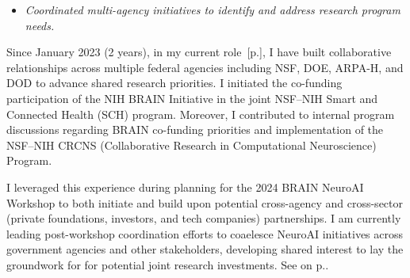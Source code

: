 \documentclass[10pt]{article}
\newcommand{\itemnote}[1]{
  \begin{description}
    \item[$\rightarrow$] \hspace{.09in}{\color{darkgray}\it #1}
  \end{description}
}
\newcommand{\see}[1]{[\textcolor{hopkinsblue}{p.\pageref{sec:#1}}]}
\newcommand{\cf}[1]{\textcolor{hopkinsblue}{See \emph{\nameref{sec:#1}} on p.\pageref{sec:#1}}}
\newcommand{\cfcf}[2]{\textcolor{hopkinsblue}{See \emph{\nameref{sec:#1}} on
  p.\pageref{sec:#1} and \emph{\nameref{sec:#2}} on p.\pageref{sec:#2}}}
\begin{document}
\begin{itemize}
  \color{hopkinsblue}
  \item \emph{Coordinated multi-agency initiatives to identify and address
research program needs.}
\end{itemize}

Since January 2023 (2 years), in my current role~\see{jobobd}, I have built
collaborative relationships across multiple federal agencies including NSF,
DOE, ARPA-H, and DOD to advance shared research priorities. I initiated the
co-funding participation of the NIH BRAIN Initiative in the joint NSF--NIH Smart
and Connected Health (SCH) program. Moreover, I contributed to internal program
discussions regarding BRAIN co-funding priorities and implementation of the
NSF--NIH CRCNS (Collaborative Research in Computational Neuroscience) Program.

I leveraged this experience during planning for the 2024 BRAIN NeuroAI Workshop
to both initiate and build upon potential cross-agency and cross-sector (private
foundations, investors, and tech companies) partnerships. I am currently leading
post-workshop coordination efforts to coaelesce NeuroAI initiatives across
government agencies and other stakeholders, developing shared interest to lay
the groundwork for for potential joint research investments. \cf{jobobd}.


\end{document}
